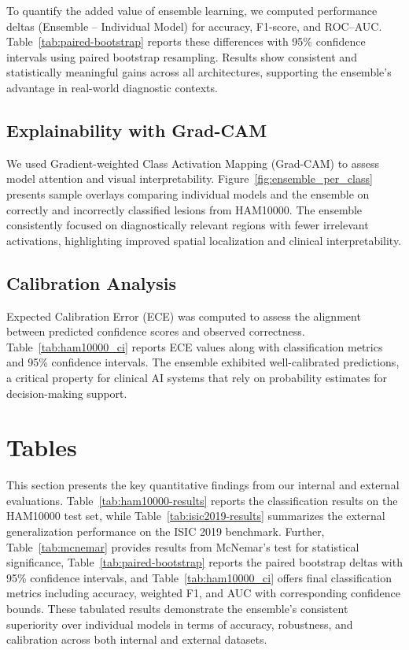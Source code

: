 \documentclass[pdflatex,sn-mathphys-num]{sn-jnl}%
\theoremstyle{thmstyleone}%
\theoremstyle{thmstyletwo}%
\theoremstyle{thmstylethree}%
\begin{document}
To quantify the added value of ensemble learning, we computed performance deltas (Ensemble – Individual Model) for accuracy, F1-score, and ROC–AUC. Table~\ref{tab:paired-bootstrap} reports these differences with 95\% confidence intervals using paired bootstrap resampling. Results show consistent and statistically meaningful gains across all architectures, supporting the ensemble’s advantage in real-world diagnostic contexts.

\subsection{Explainability with Grad-CAM}

We used Gradient-weighted Class Activation Mapping (Grad-CAM) to assess model attention and visual interpretability. Figure~\ref{fig:ensemble_per_class} presents sample overlays comparing individual models and the ensemble on correctly and incorrectly classified lesions from HAM10000. The ensemble consistently focused on diagnostically relevant regions with fewer irrelevant activations, highlighting improved spatial localization and clinical interpretability.

\subsection{Calibration Analysis}

Expected Calibration Error (ECE) was computed to assess the alignment between predicted confidence scores and observed correctness. Table~\ref{tab:ham10000_ci} reports ECE values along with classification metrics and 95\% confidence intervals. The ensemble exhibited well-calibrated predictions, a critical property for clinical AI systems that rely on probability estimates for decision-making support.

\section{Tables}\label{sec5}

This section presents the key quantitative findings from our internal and external evaluations.  
Table~\ref{tab:ham10000-results} reports the classification results on the HAM10000 test set, while Table~\ref{tab:isic2019-results} summarizes the external generalization performance on the ISIC 2019 benchmark.  
Further, Table~\ref{tab:mcnemar} provides results from McNemar’s test for statistical significance, Table~\ref{tab:paired-bootstrap} reports the paired bootstrap deltas with 95\% confidence intervals, and Table~\ref{tab:ham10000_ci} offers final classification metrics including accuracy, weighted F1, and AUC with corresponding confidence bounds.  
These tabulated results demonstrate the ensemble’s consistent superiority over individual models in terms of accuracy, robustness, and calibration across both internal and external datasets.
\end{document}
